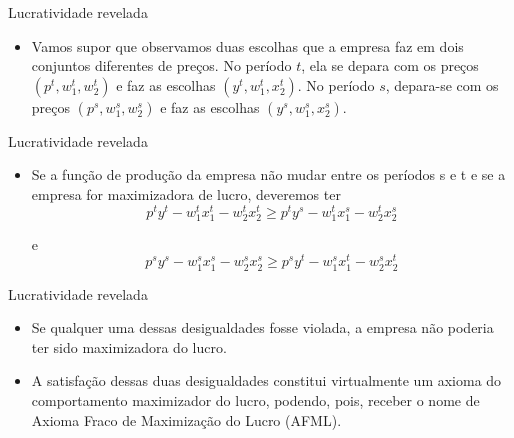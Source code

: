 \documentclass[aspectratio=169]{beamer}
\begin{document}
\begin{frame}{Lucratividade revelada}

\begin{block}{ }

\begin{itemize}
    \item Vamos supor que observamos duas escolhas que a empresa faz em dois conjuntos
diferentes de preços. No período $t$, ela se depara com os preços $(p^t , w^t_1, w^t_2)$ e faz as escolhas $(y^t, w^t_1 , x^t_2)$. No período $s$, depara-se com os preços $(p^s , w^s_1, w^s_2)$ e faz as escolhas $(y^s, w^s_1 , x^s_2)$. 
\end{itemize}

\end{block}
\end{frame}

\begin{frame}{Lucratividade revelada}

\begin{block}{ }

\begin{itemize}
    \item Se a função de produção da empresa não mudar entre os períodos s e t e se a empresa for maximizadora de lucro, deveremos ter $$p^t y^t - w^t_1 x^t_1 - w^t_2 x^t_2 \geq p^t y^s - w^t_1 x^s_1 - w^t_2 x^s_2$$

    \centering e
$$p^s y^s - w^s_1 x^s_1 - w^s_2 x^s_2 \geq p^s y^t - w^s_1 x^t_1 - w^s_2 x^t_2$$
    
\end{itemize}

\end{block}
\end{frame}

\begin{frame}{Lucratividade revelada}

\begin{block}{ }

\begin{itemize}
    \item Se qualquer uma dessas desigualdades fosse violada, a empresa não poderia ter sido maximizadora do lucro.
    \item A satisfação dessas duas desigualdades constitui virtualmente um axioma do comportamento maximizador do lucro, podendo, pois, receber o nome de \alert{Axioma Fraco de Maximização do Lucro (AFML)}.
\end{itemize}

\end{block}
\end{frame}
\end{document}
